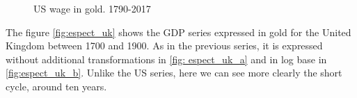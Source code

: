 \documentclass[a4paper]{article}
\begin{document}
	
	\begin{figure}[H]
		\centering
		\caption{US wage in gold. 1790-2017} \label{fig:espect_wg}
	\end{figure}
	
	The figure \ref{fig:espect_uk} shows the GDP series expressed in gold for the United Kingdom between 1700 and 1900. As in the previous series, it is expressed without additional transformations in \ref{fig: espect_uk_a} and in log base in \ref{fig:espect_uk_b}. Unlike the US series, here we can see more clearly the short cycle, around ten years.
	
\end{document}
